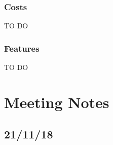 \documentclass[11pt,a4paper]{report}
\begin{document}
\subsection{Costs}
\label{subsec:costs}

TO DO


\subsection{Features}
\label{subsec:features}

TO DO


\chapter{Meeting Notes}

\section{21/11/18}
\end{document}
